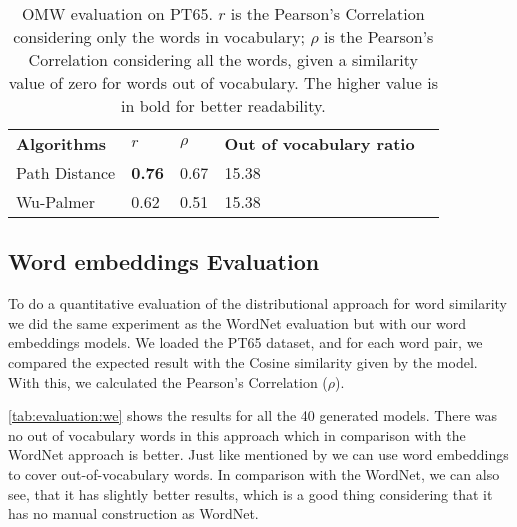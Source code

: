 \begin{table}[h]
    \caption{OMW evaluation on PT65. \textbf{$r$} is the Pearson’s Correlation considering only the words in vocabulary; \textbf{$\rho$} is the Pearson’s Correlation considering all the words, given a similarity value of zero for words out of vocabulary. The higher value is in bold for better readability.
    }
    \label{tab:worneteval}
    \centering%
    \begin{minipage}{.6\textwidth}
    \begin{tabular}{@{}lllll@{}}
    \cmidrule(r){1-5}
    \textbf{Algorithms} & \textbf{$r$} & \textbf{$\rho$}         & \textbf{Out of vocabulary ratio} \\ 
    \cmidrule(r){1-4}
    Path Distance & \textbf{0.76} & 0.67   & 15.38                   \\
    Wu-Palmer     & 0.62    & 0.51         & 15.38                   \\ \cmidrule(r){1-4}
    \end{tabular}
    \end{minipage}
\end{table}

\subsection{Word embeddings Evaluation}\label{chap:results:we}

To do a quantitative evaluation of the distributional approach for word similarity we did the same experiment as the WordNet evaluation but with our word embeddings models.
We loaded the PT65 dataset, and for each word pair, we compared the expected result with the Cosine similarity given by the model. With this, we calculated the Pearson’s Correlation ($\rho$).

\autoref{tab:evaluation:we} shows the results for all the 40 generated models. There was no out of vocabulary words in this approach which in comparison with the WordNet approach is better. Just like mentioned by  we can use word embeddings to cover out-of-vocabulary words. In comparison with the WordNet, we can also see, that it has slightly better results, which is a good thing considering that it has no manual construction as WordNet.


